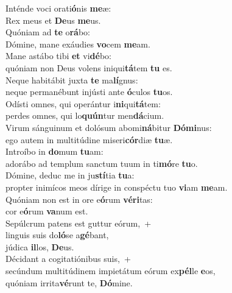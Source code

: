 \evenverse Inténde voci orati\textbf{ó}nis \textbf{me}æ:~\*\\
\evenverse Rex meus et \textbf{De}us \textbf{me}us.\\
\oddverse Quóniam ad \textbf{te} o\textbf{rá}bo:~\*\\
\oddverse Dómine, mane exáudies \textbf{vo}cem \textbf{me}am.\\
\evenverse Mane astábo tibi \textbf{et} vi\textbf{dé}bo:~\*\\
\evenverse quóniam non Deus volens iniqui\textbf{tá}tem \textbf{tu} es.\\
\oddverse Neque habitábit juxta \textbf{te} ma\textbf{lí}gnus:~\*\\
\oddverse neque permanébunt injústi ante \textbf{ó}culos \textbf{tu}os.\\
\evenverse Odísti omnes, qui operántur i\textbf{ni}qui\textbf{tá}tem:~\*\\
\evenverse perdes omnes, qui lo\textbf{quún}tur men\textbf{dá}cium.\\
\oddverse Virum sánguinum et dolósum abomi\textbf{ná}bitur \textbf{Dó}\textbf{mi}nus:~\*\\
\oddverse ego autem in multitúdine miseri\textbf{cór}diæ \textbf{tu}æ.\\
\evenverse Introíbo in \textbf{do}mum \textbf{tu}am:~\*\\
\evenverse adorábo ad templum sanctum tuum in ti\textbf{mó}re \textbf{tu}o.\\
\oddverse Dómine, deduc me in ju\textbf{stí}tia \textbf{tu}a:~\*\\
\oddverse propter inimícos meos dírige in conspéctu tuo \textbf{vi}am \textbf{me}am.\\
\evenverse Quóniam non est in ore e\textbf{ó}rum \textbf{vé}\textbf{ri}tas:~\*\\
\evenverse cor e\textbf{ó}rum \textbf{va}num est.\\
\oddverse Sepúlcrum patens est guttur eórum,~+\\
\oddverse  linguis suis do\textbf{ló}se a\textbf{gé}bant,~\*\\
\oddverse júdica \textbf{il}los, \textbf{De}us.\\
\evenverse Décidant a cogitatiónibus suis,~+\\
\evenverse  secúndum multitúdinem impietátum eórum ex\textbf{pél}le \textbf{e}os,~\*\\
\evenverse quóniam irrita\textbf{vé}runt te, \textbf{Dó}mine.\\
